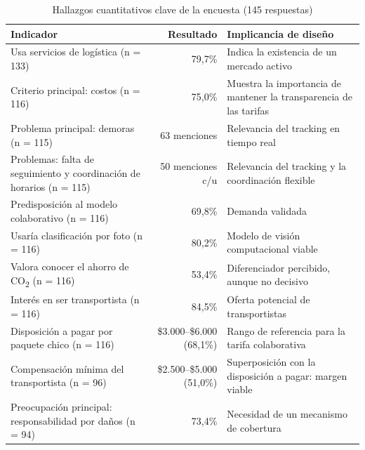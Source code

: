 \begin{table}[H]
	\caption{Hallazgos cuantitativos clave de la encuesta (145 respuestas)}
	\label{tab:hallazgos}
	\centering
	\small
	\begin{tabular}{p{5.8cm}rp{4.4cm}}
		\toprule
		\textbf{Indicador} & \textbf{Resultado} & \textbf{Implicancia de diseño} \\
		\midrule
		Usa servicios de logística (n = 133)           & 79,7\%         & Indica la existencia de un mercado activo \\
		Criterio principal: costos (n = 116)           & 75,0\%         & Muestra la importancia de mantener la transparencia de las tarifas \\
		Problema principal: demoras (n = 115)                & 63 menciones   & Relevancia del tracking en tiempo real \\
		Problemas: falta de seguimiento y coordinación de horarios (n = 115)   & 50 menciones c/u   & Relevancia del tracking y la coordinación flexible \\
		Predisposición al modelo colaborativo (n = 116)   & 69,8\%         & Demanda validada \\
		Usaría clasificación por foto (n = 116)        & 80,2\%         & Modelo de visión computacional viable \\
		Valora conocer el ahorro de CO\textsubscript{2} (n = 116) & 53,4\% & Diferenciador percibido, aunque no decisivo \\
		Interés en ser transportista (n = 116)      & 84,5\%         & Oferta potencial de transportistas \\
		Disposición a pagar por paquete chico (n = 116)        & \$3.000--\$6.000 (68,1\%)  & Rango de referencia para la tarifa colaborativa \\
		Compensación mínima del transportista (n = 96)             & \$2.500--\$5.000 (51,0\%)  & Superposición con la disposición a pagar: margen viable \\
		Preocupación principal: responsabilidad por daños (n = 94)    & 73,4\%           & Necesidad de un mecanismo de cobertura \\
		\bottomrule
	\end{tabular}
\end{table}

\section{}

